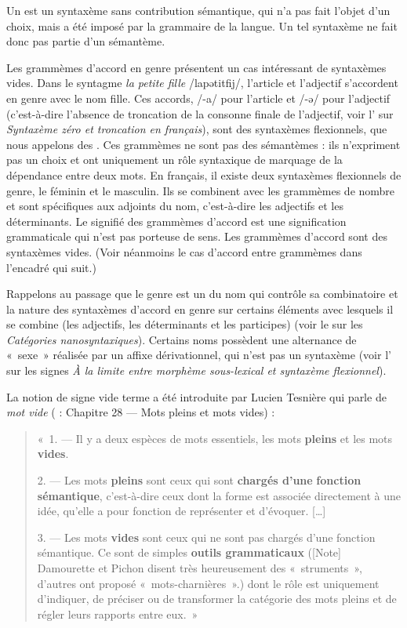 {Un  est un syntaxème sans contribution sémantique, qui n’a pas fait l’objet d’un choix, mais a été imposé par la grammaire de la langue. Un tel syntaxème ne fait donc pas partie d’un sémantème.}

Les grammèmes d’accord en genre présentent un cas intéressant de syntaxèmes vides. Dans le syntagme \textit{la petite fille} /lapətitfij/, l’article et l’adjectif s’accordent en genre avec le nom fille. Ces accords, /-a/ pour l’article et /-ə/ pour l’adjectif (c’est-à-dire l’absence de troncation de la consonne finale de l’adjectif, voir l’ sur \textit{Syntaxème zéro et troncation en français}), sont des syntaxèmes flexionnels, que nous appelons des . Ces grammèmes ne sont pas des sémantèmes : ils n’expriment pas un choix et ont uniquement un rôle syntaxique de marquage de la dépendance entre deux mots. En français, il existe deux syntaxèmes flexionnels de genre, le féminin et le masculin. Ils se combinent avec les grammèmes de nombre et sont spécifiques aux adjoints du nom, c’est-à-dire les adjectifs et les déterminants. Le signifié des grammèmes d’accord est une signification grammaticale qui n’est pas porteuse de sens. Les grammèmes d’accord sont des syntaxèmes vides. (Voir néanmoins le cas d’accord entre grammèmes dans l’encadré qui suit.)

Rappelons au passage que le genre est un  du nom qui contrôle sa combinatoire et la nature des syntaxèmes d’accord en genre sur certains éléments avec lesquels il se combine (les adjectifs, les déterminants et les participes) (voir le  sur les \textit{Catégories nanosyntaxiques}). Certains noms possèdent une alternance de «~sexe~» réalisée par un affixe dérivationnel, qui n’est pas un syntaxème (voir l’ sur les signes \textit{À la limite entre morphème sous-lexical et syntaxème flexionnel}).

La notion de signe vide terme a été introduite par Lucien Tesnière qui parle de \textit{mot vide} (\citeyear{tesniere1959elements} : Chapitre 28 — Mots pleins et mots vides) :
\begin{quote}
    «~1. — Il y a deux espèces de mots essentiels, les mots \textbf{pleins} et les mots \textbf{vides}.

    2. — Les mots \textbf{pleins} sont ceux qui sont \textbf{chargés d’une} \textbf{fonction sémantique}, c’est-à-dire ceux dont la forme est associée directement à une idée, qu’elle a pour fonction de représenter et d’évoquer. […]

    3. — Les mots \textbf{vides} sont ceux qui ne sont pas chargés d’une fonction sémantique. Ce sont de simples \textbf{outils grammaticaux} ([Note] Damourette et Pichon disent très heureusement des «~struments~», d’autres ont proposé «~mots-charnières~».) dont le rôle est uniquement d’indiquer, de préciser ou de transformer la catégorie des mots pleins et de régler leurs rapports entre eux.~»
\end{quote}


